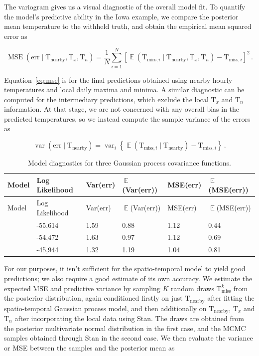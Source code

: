 \documentclass[letter]{article}
\newcommand{\genericdel}[3]{%
      \left#1#3\right#2
    }
\newcommand{\del}[1]{\genericdel(){#1}}
\newcommand{\sbr}[1]{\genericdel[]{#1}}
\newcommand{\cbr}[1]{\genericdel\{\}{#1}}
\DeclareMathOperator{\E}{\mathbb{E}}
\DeclareMathOperator{\var}{{var}}
\DeclareMathOperator{\mse}{{MSE}}
\newcommand{\T}{\mathrm{T}}
\newcommand{\Tn}{\T_{n}}
\newcommand{\Tx}{\T_{x}}
\newcommand{\miss}{\mathrm{miss}}
\newcommand{\obs}{\mathrm{nearby}}
\newcommand{\error}{\mathrm{err}}
\DeclareMathOperator{\kSESE}{k_{\mathtt{SExSE}}}
\DeclareMathOperator{\kdiurn}{k_{\mathtt{SESE_{24}}}}
\DeclareMathOperator{\ksumprod}{k_{\mathtt{sumprod}}}
\newcommand{\eqlabel}[1]{\label{#1}}
\begin{document}
The variogram gives us a visual diagnostic of the overall model fit. To quantify the model's predictive ability in the Iowa example, we compare the posterior mean temperature to the withheld truth, and obtain the empirical mean squared error as

\begin{equation}
    \label{eq:mse}
    \mse\del{\error \mid \T_\obs,\Tx,\Tn} = \frac{1}{N} \sum_{i=1}^N \sbr{\E\del{\T_{\miss,i} \mid \T_\obs,\Tx,\Tn} - \T_{\miss,i}}^2\,.
\end{equation}

Equation~\eqref{eq:mse} is for the final predictions obtained using nearby hourly temperatures and local daily maxima and minima.
A similar diagnostic can be computed for the intermediary predictions, which exclude the local \(\Tx\) and \(\Tn\) information.
At that stage, we are not concerned with any overall bias in the predicted temperatures, so we instead compute the sample variance of the errors as

\begin{equation}
    \eqlabel{eq:varerr}
    \var\del{\error \mid \T_\obs} = \var_i \cbr{\E\del{\T_{\miss,i} \mid \T_\obs} - \T_{\miss,i}}\,.
\end{equation}
    


        \begin{longtable}[]{@{}llllll@{}}
\caption{Model diagnostics for three Gaussian process covariance functions. \label{table:diagnostics}}\tabularnewline
\toprule
Model & Log Likelihood & Var(err) & \(\E\)(Var(err)) & MSE(err) & \(\E\)(MSE(err))\tabularnewline
\midrule
\endfirsthead
\toprule
Model & Log Likelihood & Var(err) & \(\E\)(Var(err)) & MSE(err) & \(\E\)(MSE(err))\tabularnewline
\midrule
\endhead
\(\kSESE\) & -55,614 & 1.59 & 0.88 & 1.12 & 0.44\tabularnewline
\(\kdiurn\) & -54,472 & 1.63 & 0.97 & 1.12 & 0.69\tabularnewline
\(\ksumprod\) & -45,944 & 1.32 & 1.19 & 1.04 & 0.81\tabularnewline
\bottomrule
\end{longtable}
    


        For our purposes, it isn't sufficient for the spatio-temporal model to yield good predictions; we also require a good estimate of its own accuracy.
We estimate the expected MSE and predictive variance by sampling \(K\) random draws \(\T^k_\miss\) from the posterior distribution, again conditioned firstly on just \(\T_\obs\) after fitting the spatio-temporal Gaussian process model, and then additionally on \(\T_\obs\), \(\Tx\) and \(\Tn\) after incorporating the local data using Stan.
The draws are obtained from the posterior multivariate normal distribution in the first case, and the MCMC samples obtained through Stan in the second case.
We then evaluate the variance or MSE between the samples and the posterior mean as
\end{document}
